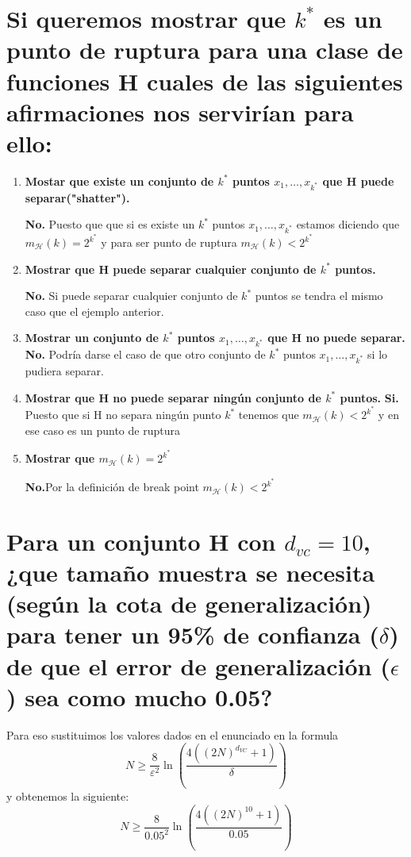 \documentclass[titlepage]{article}
\begin{document}
  	\section{Si queremos mostrar que $k^{*}$ es un punto de ruptura para una clase de funciones H cuales de las siguientes afirmaciones nos servirían para ello:} 
  	\begin{enumerate}
  		\item \textbf{Mostar que existe un conjunto de $k^{*}$ puntos $x_{1}, \dots, x_{k^{*}}$ que H puede separar("shatter").}
  		
  		\textbf{No.} Puesto que que si es existe un $k^{*}$ puntos $x_{1}, \dots, x_{k^{*}}$ estamos diciendo que $m_{\mathcal{H}}(k)=2^{k^{*}}$ y para ser punto de ruptura $m_{\mathcal{H}}(k)<2^{k^{*}}$
  		
  		\item
  		 \textbf{Mostrar que H puede separar cualquier conjunto de $k^{*}$ puntos.}
  		 
  		 \textbf{No.} Si puede separar cualquier conjunto de $k^{*}$ puntos se tendra el mismo caso que el ejemplo anterior.
  		\item
  		 \textbf{Mostrar un conjunto de $k^{*}$ puntos $x_{1}, \dots, x_{k^{*}}$ que H no puede separar.}
  		 \textbf{No.} Podría darse el caso de que otro conjunto de  $k^{*}$ puntos $x_{1}, \dots, x_{k^{*}}$ si lo pudiera separar. 
  		
  		\item \textbf{Mostrar que H no puede separar ningún conjunto de $k^{*}$ puntos.}
  		\textbf{Si.} Puesto que si H no separa ningún punto $k^{*}$ tenemos que $m_{\mathcal{H}}(k)<2^{k^{*}}$ y en ese caso es un punto de ruptura
  		
  		\item \textbf{Mostrar que $m_{\mathcal{H}}(k)=2^{k^{*}}$}
  		
  		\textbf{No.}Por la definición de break point $m_{\mathcal{H}}(k)<2^{k^{*}}$
  	\end{enumerate}
  
  	\section{Para un conjunto H con $d_{vc} = 10$, ¿que tamaño muestra se necesita (según la cota de generalización) para tener un 95\% de confianza ($\delta$) de que el error de generalización ($\epsilon$) sea como mucho 0.05?}
  	
  	Para eso sustituimos los valores dados en el enunciado en la formula 
  	$$
  	N \geq \frac{8}{\varepsilon^{2}} \ln \left(\frac{4\left((2 N)^{d_{VC}} +1\right)}{\delta}\right)
  	$$
  	y obtenemos la siguiente:
  	$$
  	N \geq \frac{8}{0.05^{2}} \ln \left(\frac{4\left((2 N)^{10} +1\right)}{0.05}\right)
  	$$
  	
\end{document}

